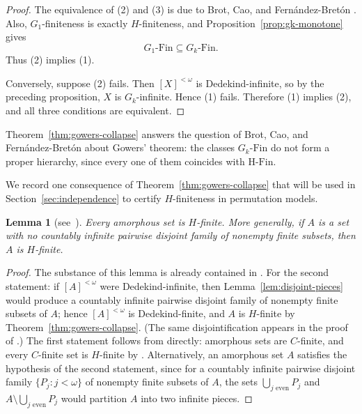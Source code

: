 \documentclass[11pt]{amsart}
\newtheorem{lemma}[theorem]{Lemma}
\theoremstyle{definition}
\newcommand{\Fin}{\mathrm{Fin}}
\newcommand{\HFin}{\mathrm{H\text{-}Fin}}
\begin{document}
\begin{proof}
The equivalence of (2) and (3) is due to Brot, Cao, and Fern\'andez-Bret\'on \cite[Theorem~3.2]{BCF}.  Also, \(G_1\)-finiteness is exactly \(H\)-finiteness, and Proposition~\ref{prop:gk-monotone} gives
\[
    G_1\text{-}\Fin\subseteq G_k\text{-}\Fin.
\]
Thus (2) implies (1).

Conversely, suppose (2) fails.  Then \([X]^{<\omega}\) is Dedekind-infinite, so by the preceding proposition, \(X\) is \(G_k\)-infinite.  Hence (1) fails.  Therefore (1) implies (2), and all three conditions are equivalent.
\end{proof}

Theorem~\ref{thm:gowers-collapse} answers the question of Brot, Cao, and Fern\'andez-Bret\'on about Gowers' theorem: the classes \(G_k\text{-}\Fin\) do not form a proper hierarchy, since every one of them coincides with \(\HFin\).

We record one consequence of Theorem~\ref{thm:gowers-collapse} that will be used in Section~\ref{sec:independence} to certify \(H\)-finiteness in permutation models.

\begin{lemma}[{see\ \cite[Theorems~3.2 and~3.7]{BCF}}]\label{lem:amorphous-hfin}
Every amorphous set is \(H\)-finite.  More generally, if \(A\) is a set with no countably infinite pairwise disjoint family of nonempty finite subsets, then \(A\) is \(H\)-finite.
\end{lemma}

\begin{proof}
The substance of this lemma is already contained in \cite{BCF}.  For the second statement: if \([A]^{<\omega}\) were Dedekind-infinite, then Lemma~\ref{lem:disjoint-pieces} would produce a countably infinite pairwise disjoint family of nonempty finite subsets of \(A\); hence \([A]^{<\omega}\) is Dedekind-finite, and \(A\) is \(H\)-finite by Theorem~\ref{thm:gowers-collapse}.  (The same disjointification appears in the proof of \cite[Theorem~3.2]{BCF}.)  The first statement follows from \cite{BCF} directly: amorphous sets are \(C\)-finite, and every \(C\)-finite set is \(H\)-finite by \cite[Theorem~3.7]{BCF}.  Alternatively, an amorphous set \(A\) satisfies the hypothesis of the second statement, since for a countably infinite pairwise disjoint family \(\{P_j:j<\omega\}\) of nonempty finite subsets of \(A\), the sets \(\bigcup_{j\text{ even}}P_j\) and \(A\setminus\bigcup_{j\text{ even}}P_j\) would partition \(A\) into two infinite pieces.
\end{proof}
\end{document}
